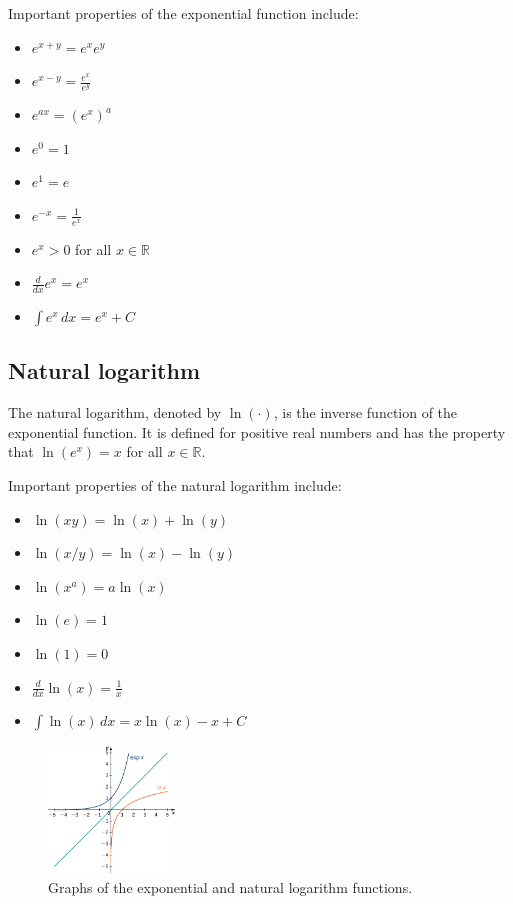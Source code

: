\documentclass[11pt]{book} %
\begin{document}
Important properties of the exponential function include:
\begin{itemize}
    \item \(e^{x+y} = e^x e^y\)
    \item \(e^{x-y} = \frac{e^x}{e^y}\)
    \item \(e^{ax} = (e^x)^a\)
    \item \(e^0 = 1\)
    \item \(e^1 = e\)
    \item \(e^{-x} = \frac{1}{e^x}\)
    \item \(e^{x} > 0\) for all \(x \in \mathbb{R}\)
    \item $\frac{d}{dx} e^x = e^x$
    \item $\int e^x \, dx = e^x + C$
\end{itemize}


\subsection{Natural logarithm}
The natural logarithm, denoted by \(\ln(\cdot)\), is the inverse function of the exponential function. 
It is defined for positive real numbers and has the property that \(\ln(e^x) = x\) for all \(x \in \mathbb{R}\).

Important properties of the natural logarithm include:
\begin{itemize}
    \item \(\ln(xy) = \ln(x) + \ln(y)\)
    \item \(\ln(x/y) = \ln(x) - \ln(y)\)
    \item \(\ln(x^a) = a \ln(x)\)
    \item \(\ln(e) = 1\)
    \item \(\ln(1) = 0\)
    \item $\frac{d}{dx} \ln(x) = \frac{1}{x}$
    \item $\int \ln(x) \, dx = x \ln(x) - x + C$
\end{itemize}

\begin{figure}[h]
    \centering
    \includegraphics[width=0.3\textwidth]{Figs/exp_and_log.jpeg}
    \caption{Graphs of the exponential and natural logarithm functions.}
    \label{fig:exp_log}
\end{figure}
\end{document}

